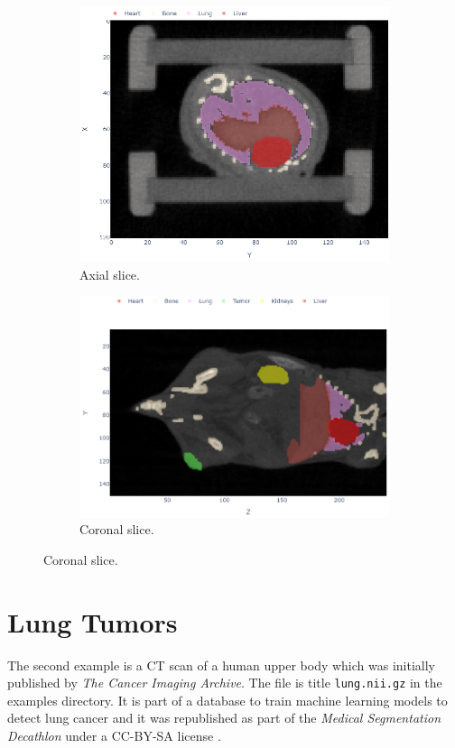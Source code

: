 \begin{figure}[h]
	\centering
	\begin{subfigure}[t]{0.4\linewidth}
		\centering
		\includegraphics[width=\linewidth]{figures/mouse_axial.png}
		\caption{Axial slice.}
	\end{subfigure}
	\hfill
	\begin{subfigure}[t]{0.55\linewidth}
		\centering
		\includegraphics[width=\linewidth]{figures/mouse_coronal.png}
		\caption{Coronal slice.}
	\end{subfigure}
\end{figure}

\section{Lung Tumors}
The second example is a CT scan of a human upper body which was initially published by \emph{The Cancer Imaging Archive}. The file is title \texttt{lung.nii.gz} in the examples directory. It is part of a database to train machine learning models to detect lung cancer and it was republished as part of the \emph{Medical Segmentation Decathlon} under a CC-BY-SA license \cite{data}.


